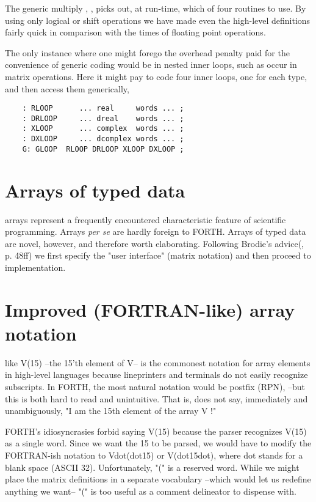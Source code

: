 The generic multiply , \eg, picks out, at run-time, which of four routines to use. By using only logical or shift operations we have made even the high-level definitions fairly quick in comparison with the times of floating point operations.

The only instance where one might forego the overhead penalty paid for the convenience of generic coding would be in nested inner loops, such as occur in matrix operations. Here it might pay to code four inner loops, one for each type, and then access them generically, \eg

\begin{lstlisting}
    : RLOOP      ... real     words ... ;
    : DRLOOP     ... dreal    words ... ;
    : XLOOP      ... complex  words ... ;
    : DXLOOP     ... dcomplex words ... ;
    G: GLOOP  RLOOP DRLOOP XLOOP DXLOOP ;
\end{lstlisting}

\section{Arrays of typed data}

 arrays represent a frequently encountered characteristic feature of scientific programming. Arrays \textit{per se} are hardly foreign to FORTH. Arrays of typed data are novel, however, and therefore worth elaborating. Following Brodie's advice(\TF, p. 48ff) we first specify the "user interface" (matrix notation) and then proceed to implementation.

\section{Improved (FORTRAN-like) array notation}
 like V(15) --the 15'th element of V-- is the commonest notation for array elements in high-level languages because lineprinters and terminals do not easily recognize subscripts. In FORTH, the most natural notation would be postfix (RPN),  --but this is both hard to read and unintuitive. That is,  does not say, immediately and unambiguously, "I am the 15th element of the array V !"

FORTH's idiosyncrasies forbid saying V(15) because the parser recognizes V(15) as a single word. Since we want the 15 to be parsed, we would have to modify the FORTRAN-ish notation to Vdot(dot15) or V(dot15dot), where dot stands for a blank space (ASCII 32). Unfortunately, "(" is a reserved word. While we might place the matrix definitions in a separate vocabulary --which would let us redefine anything we want-- "(" is too useful as a comment delineator to dispense with.

